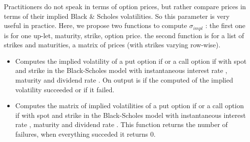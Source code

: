 Practitioners do not speak in terms of option prices, but rather compare
prices in terms of their implied Black \& Scholes volatilities. So this
parameter is very useful in practice. Here, we propose two functions to
compute $\sigma_{impl}$ : the first one is for one up-let, maturity,
strike, option price.  the second function is for a list of strikes and
maturities, a matrix of prices (with strikes varying row-wise).

\begin{itemize}
  \item 
    \sshortdescribe Computes the implied volatility of a put option if
     or a call option if  with spot  and
    strike  in the Black-Scholes model with instantaneous interest rate
    , maturity  and dividend rate . On output
     is  if the computed of the implied volatility succeeded
    or  if it failed.

  \item 
    \sshortdescribe Computes the matrix of implied volatilities  of a put option if
     or a call option if  with spot  and
    strike  in the Black-Scholes model with instantaneous interest rate
    , maturity  and dividend rate . This function
    returns the number of failures, when everything succeded it returns $0$.
\end{itemize}

